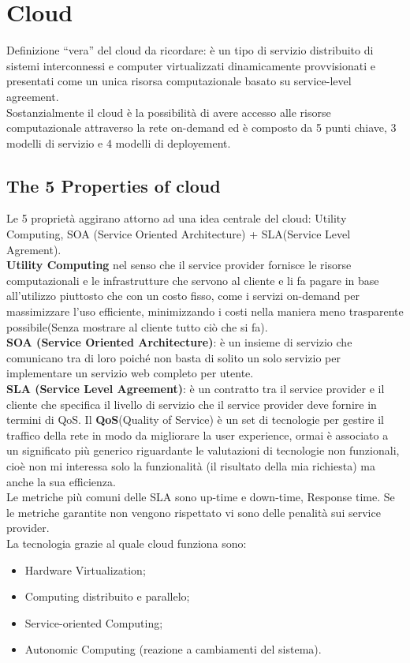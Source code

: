 \documentclass[11pt, twocolumn]{article}
\newenvironment{myitemize}
{ \begin{itemize}[topsep=0ex]
		\setlength{\itemsep}{0pt}
		\setlength{\parskip}{0pt}
		\setlength{\parsep}{0pt}     }
	{ \end{itemize}                  }
\begin{document}
\section{Cloud}
Definizione ``vera'' del cloud da ricordare: è un tipo di servizio distribuito di sistemi interconnessi e computer virtualizzati dinamicamente provvisionati e presentati come un unica risorsa computazionale basato su service-level agreement.
\\
Sostanzialmente il cloud è la possibilità di avere accesso alle risorse computazionale attraverso la rete on-demand ed è composto da 5 punti chiave, 3 modelli di servizio e 4 modelli di deployement.

\subsection{The 5 Properties of cloud}
Le 5 proprietà aggirano attorno ad una idea centrale del cloud: Utility Computing, SOA (Service Oriented Architecture) + SLA(Service Level Agrement).\\
\textbf{Utility Computing} nel senso che il service provider fornisce le risorse computazionali e le infrastrutture che servono al cliente e li fa pagare in base all'utilizzo piuttosto che con un costo fisso, come i servizi on-demand per massimizzare l'uso efficiente, minimizzando i costi nella maniera meno trasparente possibile(Senza mostrare al cliente tutto ciò che si fa).\\
\textbf{SOA (Service Oriented Architecture)}: è un insieme di servizio che comunicano tra di loro poiché non basta di solito un solo servizio per implementare un servizio web completo per utente.\\
\textbf{SLA (Service Level Agreement)}: è un contratto tra il service provider e il cliente che specifica il livello di servizio che il service provider deve fornire in termini di QoS.
Il \textbf{QoS}(Quality of Service) è un set di tecnologie per gestire il traffico della rete in modo da migliorare la user experience, ormai è associato a un significato più generico riguardante le valutazioni di tecnologie non funzionali, cioè non mi interessa solo la funzionalità (il risultato della mia richiesta) ma anche la sua efficienza.\\
Le metriche più comuni delle SLA sono up-time e down-time, Response time. Se le metriche garantite non vengono rispettato vi sono delle penalità sui service provider.\\
La tecnologia grazie al quale cloud funziona sono:
\begin{myitemize}
	\item Hardware Virtualization;
	\item Computing distribuito e parallelo;
	\item Service-oriented Computing;
	\item Autonomic Computing (reazione a cambiamenti del sistema).
\end{myitemize}
\end{document}
